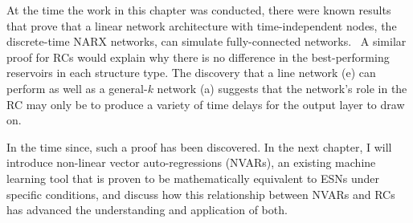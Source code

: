 At the time the work in this chapter was conducted, there were known
results that prove that a linear network architecture with
time-independent nodes, the discrete-time NARX networks, can simulate
fully-connected networks.~\cite{siegelmann1997} A similar proof for RCs
would explain why there is no difference in the best-performing
reservoirs in each structure type. The discovery that a line network
(e) can perform as well as a general-$k$ network (a) suggests that the
network's role in the RC may only be to produce a variety of time
delays for the output layer to draw on.

In the time since, such a proof has been discovered. In the next
chapter, I will introduce non-linear vector auto-regressions (NVARs),
an existing machine learning tool that is proven to be mathematically
equivalent to ESNs under specific conditions, and discuss how this
relationship between NVARs and RCs has advanced the understanding and
application of both.
